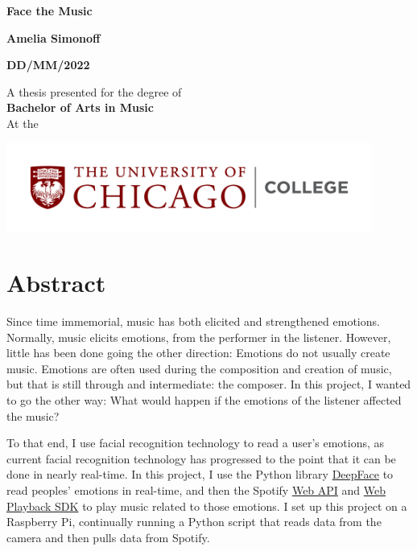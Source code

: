 \documentclass{article}
\title{}
\author{Amelia Simonoff}
\date{MONTH DD 2022}
\renewcommand{\_}[1]{\underline{ #1 }}
\theoremstyle{definition}
\begin{document}
\begin{titlepage}
    \begin{center}
        \vspace*{1cm}
            
        \Huge
        \textbf{Face the Music}
            
        \vspace{0.5cm}
        \LARGE
            
        \vspace{1.5cm}
            
        \textbf{Amelia Simonoff}
        
        \textbf{DD/MM/2022}
            
        \vfill
            
        A thesis presented for the degree of\\
        \textbf{Bachelor of Arts in Music} \\
        At the
        
        \vspace{0.8cm}
            
        \includegraphics[width=0.9\textwidth]{UChicago_College_Horizontal_Color_RGB.png}

        \Large
            
    \end{center}
\end{titlepage}

\section{Abstract}

Since time immemorial, music has both elicited and strengthened emotions. Normally, music elicits emotions, from the performer in the listener. However, little has been done going the other direction: Emotions do not usually create music. Emotions are often used during the composition and creation of music, but that is still through and intermediate: the composer. In this project, I wanted to go the other way: What would happen if the emotions of the listener affected the music?

To that end, I use facial recognition technology to read a user's emotions, as current facial recognition technology has progressed to the point that it can be done in nearly real-time. In this project, I use the Python library \href{https://pypi.org/project/deepface/}{DeepFace} to read peoples' emotions in real-time, and then the Spotify \href{https://developer.spotify.com/documentation/web-api/reference/}{Web API} and \href{https://developer.spotify.com/documentation/web-playback-sdk/reference/}{Web Playback SDK} to play music related to those emotions. I set up this project on a Raspberry Pi, continually running a Python script that reads data from the camera and then pulls data from Spotify. 
\end{document}
